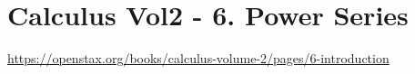 \section{Calculus Vol2 - 6. Power Series}

\url{https://openstax.org/books/calculus-volume-2/pages/6-introduction}

\clearpage
\clearpage
\clearpage
\clearpage
